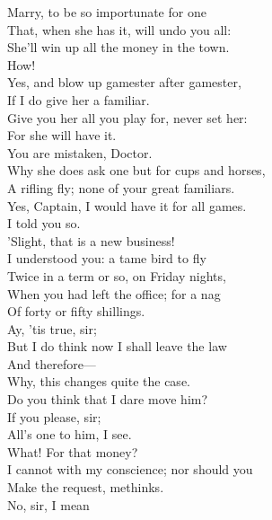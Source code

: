 \documentclass[a4paper,oneside,12pt]{memoir}
\begin{document}
\begin{drama*}
\subtlespeaks Marry, to be so importunate for one\\
That, when she has it, will undo you all:\\
She'll win up all the money in the town.\\
\facespeaks How!\\
\subtlespeaks {} Yes, and blow up gamester after gamester,\\
If I do give her a familiar.\\
Give you her all you play for, never set her:\\
For she will have it.\\
\facespeaks {} You are mistaken, Doctor.\\
Why she does ask one but for cups and horses,\\
A rifling fly; none of your great familiars.\\
\dapperspeaks Yes, Captain, I would have it for all games.\\
\subtlespeaks I told you so.\\
\facespeaks {}  'Slight, that is a new business!\\
I understood you: a tame bird to fly\\
Twice in a term or so, on Friday nights,\\
When you had left the office; for a nag\\
Of forty or fifty shillings.\\
\dapperspeaks {} Ay, 'tis true, sir;\\
But I do think now I shall leave the law\\
And therefore---\\
\facespeaks {} Why, this changes quite the case.\\
Do you think that I dare move him?\\
\dapperspeaks {} If you please, sir;\\
All's one to him, I see.\\
\facespeaks {} What! For that money?\\
I cannot with my conscience; nor should you\\
Make the request, methinks.\\
\dapperspeaks {} No, sir, I mean\\

\end{drama*}
\end{document}
